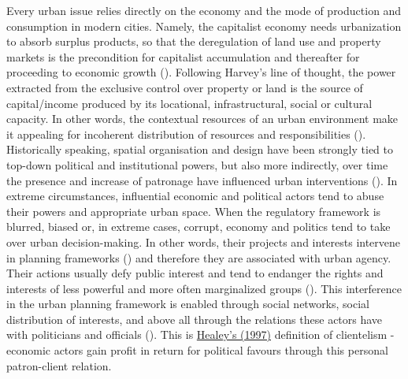 \documentclass[11pt]{report}
\begin{document}
{{{Every urban issue relies directly on the economy  and  the  mode  of  production  and  consumption  in  modern  cities.  Namely,  the  capitalist  economy  needs urbanization to absorb surplus products, so that the deregulation of land use and property markets is the precondition for capitalist accumulation and thereafter for proceeding to economic growth (\href{Harvey}{\citealt{harvey_rebel_2012}}).
Following Harvey’s line of thought, the power  extracted  from  the  exclusive  control  over  property  or  land  is  the  source  of  capital/income  produced  by  its  locational, infrastructural, social or cultural capacity.
In other words, the contextual resources of an urban environment make it appealing for incoherent distribution of resources and responsibilities (\href{Bolay}{\citealt{bolay_urban_2005}}).
\\

Historically speaking, spatial organisation and design have been strongly tied to top-down political and institutional powers, but also more indirectly, over time the presence and increase of patronage have influenced urban interventions
(\href{Van}{\citealt{van_assche_power_2014}}).
In extreme circumstances, influential economic and political actors tend to abuse their powers and appropriate urban space.
When the regulatory framework is blurred, biased or, in extreme cases, corrupt, economy and politics tend to take over urban decision-making.
In other words, their projects and interests intervene in planning frameworks
(\href{Hudson}{\citealt{hudson_political_2014}}) and therefore they are associated with urban agency.
\\

Their actions usually defy public interest and tend to endanger the rights and interests of less powerful and more often marginalized groups (\href{Sager}{\citealt{sager_logic_2006}}).
This interference in the urban planning framework is enabled through social networks, social distribution of interests, and above all through the relations these actors have with politicians and officials
(\href{Healey}{\citealt{healey_collaborative_1997}}).
This is \href{Healey}{Healey's (1997)} definition of clientelism - economic actors gain profit in return for political favours through this personal patron-client relation.
\\

}}}
\end{document}

